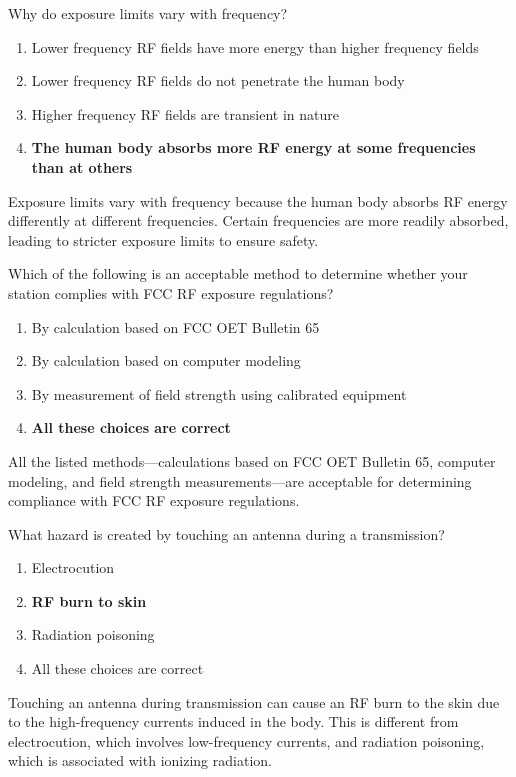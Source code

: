 
\begin{tcolorbox}[colback=gray!10!white,colframe=black!75!black,title={T0C05}]
Why do exposure limits vary with frequency?
\begin{enumerate}[label=\Alph*,noitemsep]
    \item Lower frequency RF fields have more energy than higher frequency fields
    \item Lower frequency RF fields do not penetrate the human body
    \item Higher frequency RF fields are transient in nature
    \item \textbf{The human body absorbs more RF energy at some frequencies than at others}
\end{enumerate}
\end{tcolorbox}
Exposure limits vary with frequency because the human body absorbs RF energy differently at different frequencies. Certain frequencies are more readily absorbed, leading to stricter exposure limits to ensure safety.


\begin{tcolorbox}[colback=gray!10!white,colframe=black!75!black,title={T0C06}]
Which of the following is an acceptable method to determine whether your station complies with FCC RF exposure regulations?
\begin{enumerate}[label=\Alph*,noitemsep]
    \item By calculation based on FCC OET Bulletin 65
    \item By calculation based on computer modeling
    \item By measurement of field strength using calibrated equipment
    \item \textbf{All these choices are correct}
\end{enumerate}
\end{tcolorbox}
All the listed methods—calculations based on FCC OET Bulletin 65, computer modeling, and field strength measurements—are acceptable for determining compliance with FCC RF exposure regulations.


\begin{tcolorbox}[colback=gray!10!white,colframe=black!75!black,title={T0C07}]
What hazard is created by touching an antenna during a transmission?
\begin{enumerate}[label=\Alph*,noitemsep]
    \item Electrocution
    \item \textbf{RF burn to skin}
    \item Radiation poisoning
    \item All these choices are correct
\end{enumerate}
\end{tcolorbox}
Touching an antenna during transmission can cause an RF burn to the skin due to the high-frequency currents induced in the body. This is different from electrocution, which involves low-frequency currents, and radiation poisoning, which is associated with ionizing radiation.

